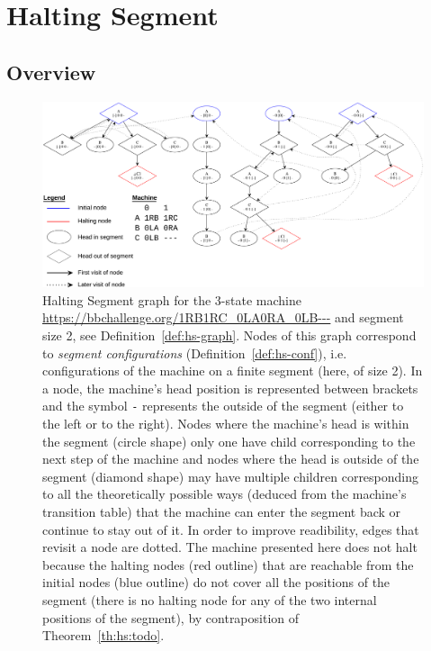 \newcommand{\HS}{Halting Segment\xspace}

\section{Halting Segment}\label{sec:halting-segment}
\subsection{Overview}
\begin{figure}[h!]
  \centering
  \includegraphics[width=1\textwidth]{halting-segment.pdf}
  \caption{\HS graph for the 3-state machine \url{https://bbchallenge.org/1RB1RC_0LA0RA_0LB---} and segment size 2, see Definition~\ref{def:hs-graph}. Nodes of this graph correspond to \textit{segment configurations} (Definition~\ref{def:hs-conf}), i.e. configurations of the machine on a finite segment (here, of size 2). In a node, the machine's head position is represented between brackets and the symbol \texttt{-} represents the outside of the segment (either to the left or to the right). Nodes where the machine's head is within the segment (circle shape) only one have child corresponding to the next step of the machine and nodes where the head is outside of the segment (diamond shape) may have multiple children corresponding to all the theoretically possible ways (deduced from the machine's transition table) that the machine can enter the segment back or continue to stay out of it. In order to improve readibility, edges that revisit a node are dotted. The machine presented here does not halt because the halting nodes (red outline) that are reachable from the initial nodes (blue outline) do not cover all the positions of the segment (there is no halting node for any of the two internal positions of the segment), by contraposition of Theorem~\ref{th:hs:todo}. }\label{fig:hs}
\end{figure}


